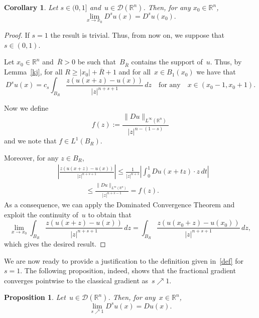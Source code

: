 \documentclass[11pt,hyp,]{nyjm}
\numberwithin{equation}{section}
\newcommand{\R}{\mathbb{R}}
\newtheorem{corollary}[theorem]{Corollary}
\newtheorem{proposition}[theorem]{Proposition}
\theoremstyle{remark}
\renewcommand{\le}{\leqslant}
\renewcommand{\ge}{\geqslant}
\begin{document}
\begin{corollary}\label{ptems}
Let $s \in (0,1]$ and~$u \in \mathcal{D}(\R^n)$. Then, for any $x_0 \in \R^n$, 
\[\lim_{x\to x_0} D^s u(x) = D^s u(x_0). \]
\end{corollary}
\begin{proof}
If $s=1$ the result is trivial. Thus, from now on, we suppose that~$s \in (0,1)$.

Let $x_0 \in \R^n$
and~$\overline R >0$ be such that~$B_{\overline R}$ contains the support of~$u$.
Thus, by Lemma~\ref{kj}, for all $R\ge|x_0|+\overline R+1$ and for all~$x\in B_1(x_0)$ we have that
\begin{equation}
D^su(x) = c_s \int_{B_R}  \frac{z(u(x+z)-u(x))}{|z|^{n+s+1}} \, dz \quad\mbox{for any}\quad x \in (x_0-1, x_0+1).
\end{equation}

Now we define
\[ f(z) := \frac{\|Du\|_{L^{\infty}(\R^n)}}{|z|^{n-(1-s)}} \]and we note that $f \in L^1(B_R)$.

Moreover, for any $z \in B_R $,
\begin{equation*}\begin{split}&
\left|\frac{z(u(x+z)-u(x))}{|z|^{n+s+1}}\right|\le
\frac{1}{|z|^{n+s}}\left|\int_0^1 D u(x+tz)\cdot z\,dt\right|\\&\qquad\qquad\le \frac{\|Du\|_{L^{\infty}(\R^n)}}{|z|^{n+s-1}} =f(z).\end{split}
\end{equation*}
As a consequence, we can apply the Dominated Convergence Theorem and exploit the continuity of~$u$ to obtain that
\[ \lim_{x\to x_0} \int_{B_R}   \frac{z(u(x+z)-u(x))}{|z|^{n+s+1}} \, dz = \int_{B_R}  \frac{z(u(x_0+z)-u(x_0))}{|z|^{n+s+1}} \, dz ,\]which gives the desired result.
\end{proof}

We are now ready to provide a  justification to the definition given in~\eqref{def} for~$s=1$. The following proposition, indeed, shows that the fractional gradient converges pointwise to the classical gradient as~$s \nearrow 1$. 

\begin{proposition}\label{gra}
				Let~$u \in \mathcal{D}(\R^n)$. Then, for any~$x \in \R^n$,
				\[ \lim_{s \nearrow 1}  D^s u (x) =  Du (x) .\]
				
			\end{proposition}
			
\end{document}
